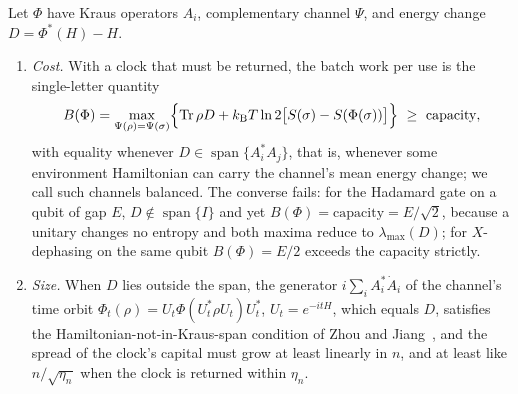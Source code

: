 \begin{theorem}\label{thm:main-heisenberg}
Let $\Phi$ have Kraus operators $A_i$, complementary channel $\Psi$, and energy change $D=\Phi^*(H)-H$.
\begin{enumerate}[label=(\alph*),leftmargin=*]
\item \emph{Cost.} With a clock that must be returned, the batch work per use is the single-letter quantity
\[
B(\Phi)=\max_{\Psi(\rho)=\Psi(\sigma)}\Bigl\{\Tr\rho D+\kB T\ln2\bigl[S(\sigma)-S(\Phi(\sigma))\bigr]\Bigr\}\ \ge\ \text{capacity},
\]
with equality whenever $D\in\operatorname{span}\{A_i^*A_j\}$, that is, whenever some environment Hamiltonian can carry the channel's mean energy change; we call such channels balanced. The converse fails: for the Hadamard gate on a qubit of gap $E$, $D\notin\operatorname{span}\{I\}$ and yet $B(\Phi)=\text{capacity}=E/\sqrt2$, because a unitary changes no entropy and both maxima reduce to $\lambda_{\max}(D)$; for $X$-dephasing on the same qubit $B(\Phi)=E/2$ exceeds the capacity strictly.
\item \emph{Size.} When $D$ lies outside the span, the generator $i\sum_iA_i^*\dot A_i$ of the channel's time orbit $\Phi_t(\rho)=U_t\Phi(U_t^*\rho U_t)U_t^*$, $U_t=e^{-itH}$, which equals $D$, satisfies the Hamiltonian-not-in-Kraus-span condition of Zhou and Jiang~\cite{ZhouJiang21}, and the spread of the clock's capital must grow at least linearly in $n$, and at least like $n/\sqrt{\eta_n}$ when the clock is returned within $\eta_n$.
\end{enumerate}
\end{theorem}

